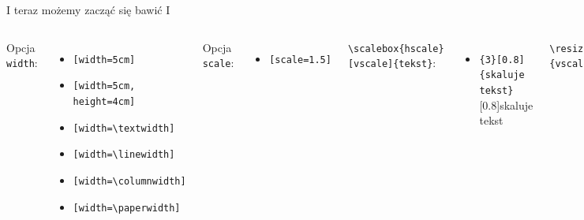 \documentclass[handout]{beamer}
\newcommand{\tb}{\textbackslash}
\begin{document}
\begin{frame}{I teraz możemy zacząć się bawić I}{}
\begin{columns}
    Opcja \texttt{width}:
    \begin{itemize}[<+->]
        \item \texttt{[width=5cm]}
        \item \texttt{[width=5cm, height=4cm]}
        \item \texttt{[width=\tb{}textwidth]}
        \item \texttt{[width=\tb{}linewidth]}
        \item \texttt{[width=\tb{}columnwidth]}
        \item \texttt{[width=\tb{}paperwidth]}
    \end{itemize}\pause
    Opcja \texttt{scale}:
    \begin{itemize}
        \item \texttt{[scale=1.5]}
    \end{itemize}\pause%
    \texttt{\tb{scalebox}\{hscale\}[vscale]\{tekst\}}:
    \begin{itemize}
        \item \texttt{\{3\}[0.8]\{skaluje tekst\}\\}
        \scalebox{3}[0.8]{skaluje tekst}
    \end{itemize}\pause
    \texttt{\tb{resizebox}\{hscale\}\{vscale\}\{tekst\}}:
    \begin{itemize}
        \item \texttt{\{3cm\}\{0.8cm\}\{skaluje tekst\}\\}
        \item \texttt{\{2\tb{}hsize\}\{!\}\{skaluje tekst\}\\}
    \end{itemize}
    \begin{figure}
        \centering
        \includegraphics[width=\linewidth]{mem3}

\end{figure}
\end{columns}
\end{frame}
\end{document}
